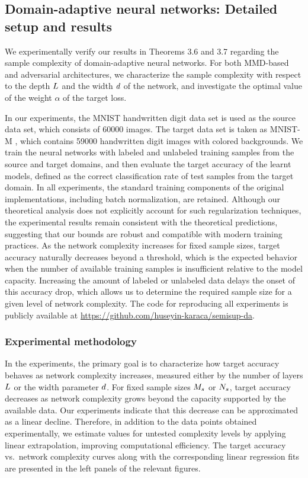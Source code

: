 \documentclass[review,supplement,onefignum,onetabnum]{siamonline250211}
\begin{document}
\subsection{Domain-adaptive neural networks: Detailed setup and results}
\label{ssec_exp_dan_detailed}

We experimentally verify our results in Theorems 3.6 and 3.7 regarding the sample complexity of domain-adaptive neural networks. For both MMD-based and adversarial architectures, we characterize the sample complexity with respect to the depth $L$ and the width ${d}$ of the network, and investigate the optimal value of the weight $\alpha$ of the target loss.

In our experiments, the MNIST handwritten digit data set \cite{mnist} is used as the source data set, which consists of 60000 images. The target data set is taken as MNIST-M \cite{mnistm}, which contains 59000 handwritten digit images with colored backgrounds. We train the neural networks with labeled and unlabeled training samples from the source and target domains, and then evaluate the target accuracy of the learnt models, defined as the correct classification rate of test samples from the target domain. In all experiments, the standard training components of the original implementations, including batch normalization, are retained. Although our theoretical analysis does not explicitly account for such regularization techniques, the experimental results remain consistent with the theoretical predictions, suggesting that our bounds are robust and compatible with modern training practices. As the network complexity increases for fixed sample sizes, target accuracy naturally decreases beyond a threshold, which is the expected behavior when the number of available training samples is insufficient relative to the model capacity. Increasing the amount of labeled or unlabeled data delays the onset of this accuracy drop, which allows us to determine the required sample size for a given level of network complexity. The code for reproducing all experiments is publicly available at \url{https://github.com/huseyin-karaca/semisup-da}.

\subsubsection{Experimental methodology}
\label{sssec_exp_methodology}

In the experiments, the primary goal is to characterize how target accuracy behaves as network complexity increases, measured either by the number of layers $L$ or the width parameter ${d}$. For fixed sample sizes $M_s$ or $N_s$, target accuracy decreases as network complexity grows beyond the capacity supported by the available data. Our experiments indicate that this decrease can be approximated as a linear decline. Therefore, in addition to the data points obtained experimentally, we estimate values for untested complexity levels by applying linear extrapolation, improving computational efficiency. The target accuracy vs.\ network complexity curves along with the corresponding linear regression fits are presented in the left panels of the relevant figures.
\end{document}
